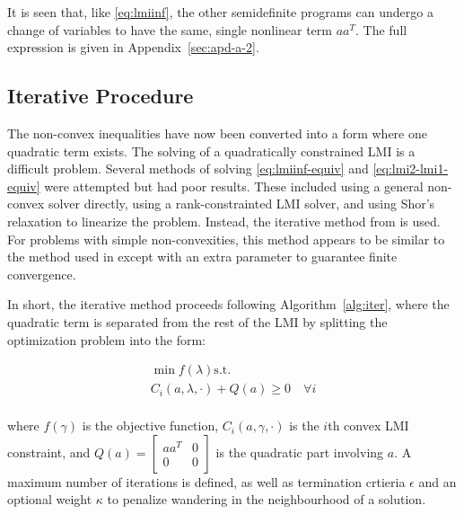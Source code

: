 It is seen that, like \autoref{eq:lmiinf}, the other semidefinite programs can undergo a change of variables to have the same, single nonlinear term $aa^T$. The full expression is given in Appendix~\ref{sec:apd-a-2}.

\subsection{Iterative Procedure}

The non-convex inequalities have now been converted into a form where one quadratic term exists. The solving of a quadratically constrained \gls{LMI} is a difficult problem. Several methods of solving \autoref{eq:lmiinf-equiv} and \autoref{eq:lmi2-lmi1-equiv} were attempted but had poor results. These included using a general non-convex solver directly, using a rank-constrainted LMI solver, and using Shor's relaxation to linearize the problem. Instead, the iterative method from \cite{Shishkin2017} is used. For problems with simple non-convexities, this method appears to be similar to the method used in \cite{Li2014} except with an extra parameter to guarantee finite convergence. 

In short, the iterative method proceeds following Algorithm~\ref{alg:iter}, where the quadratic term is separated from the rest of the \gls{LMI} by splitting the optimization problem into the form:

\begin{equation} \label{eq:opt-prb}
	\begin{gathered}
		\min f(\lambda) \mathrm{ s.t.} \\
		C_i(a, \lambda, \cdot) + Q(a) \geq 0 \quad \forall i \\	
	\end{gathered}
\end{equation}

where $f(\gamma)$ is the objective function, $C_i(a, \gamma, \cdot)$ is the $i$th convex \gls{LMI} constraint, and $Q(a)=\begin{bmatrix} aa^T & 0 \\ 0 & 0 \end{bmatrix}$ is the quadratic part involving $a$. A maximum number of iterations  is defined, as well as termination crtieria $\epsilon$ and an optional weight $\kappa$ to penalize wandering in the neighbourhood of a solution.

